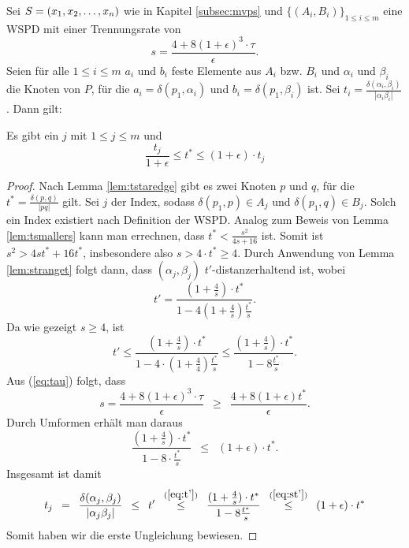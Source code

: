 Sei $S = (x_1, x_2, \mathellipsis, x_n)$ wie in Kapitel \ref{subsec:mvps} und $\{(A_i, B_i)\}_{1 \leq i \leq m}$ eine WSPD mit einer Trennungsrate von 
\[
s = \frac{4 + 8(1 + \epsilon)^3 \cdot \tau}{\epsilon}.
\]
Seien für alle $1 \leq i \leq m$ $a_i$ und $b_i$ feste Elemente aus $A_i$ bzw. $B_i$ und $\alpha_i$ und $\beta_i$ die Knoten von $P$, für die $a_i = \delta(p_1, \alpha_i)$ und $b_i = \delta(p_1, \beta_i)$ ist. 
Sei $t_i = \frac{\delta(\alpha_i, \beta_i)}{|\alpha_i \beta_i|}$. Dann gilt:
\begin{lemma}
	\label{lem:tstartj}
	Es gibt ein $j$ mit $1 \leq j \leq m$ und
	\[
		\frac{t_j}{1 + \epsilon} \leq t^* \leq (1 + \epsilon) \cdot t_j
	\]
\end{lemma}
\begin{proof}
	Nach Lemma \ref{lem:tstaredge} gibt es zwei Knoten $p$ und $q$, für die $t^* = \frac{\delta(p, q)}{|pq|}$ gilt. Sei $j$ der Index, sodass $\delta(p_1, p) \in A_j$ und $\delta(p_1, q) \in B_j$. Solch ein Index existiert nach Definition der WSPD. Analog zum Beweis von Lemma \ref{lem:tsmallers} kann man errechnen, dass $t^* < \frac{s^2}{4s + 16}$ ist. Somit ist $s^2 > 4st^* + 16t^*$, insbesondere also $s > 4\cdot t^* \geq 4$. 
	Durch Anwendung von Lemma \ref{lem:stranget} folgt dann, dass $(\alpha_j, \beta_j)$ $t'$-distanzerhaltend ist, wobei
	\[
	t' = \frac{(1 + \frac{4}{s}) \cdot t^*}{1 - 4(1 + \frac{4}{s})\frac{t^*}{s}}.
	\]
	Da wie gezeigt $s \geq 4$, ist
	\[
	\label{eq:t'}
	t' \leq  \frac{(1 + \frac{4}{s}) \cdot t^*}{1 - 4 \cdot (1 + \frac{4}{4}) \frac{t^*}{s}}
	\leq \frac{(1 + \frac{4}{s}) \cdot t^*}{1 - 8\frac{t^*}{s}}. \tag{1}
	\]
	Aus (\ref{eq:tau}) folgt, dass 
	\[
	s = \frac{4 + 8(1 + \epsilon)^3 \cdot \tau}{\epsilon} 
	\enspace\geq\enspace \frac{4 + 8(1 + \epsilon)t^*}{\epsilon}.
	\]
	Durch Umformen erhält man daraus
	\[
	\label{eq:st'}
	\frac{(1 + \frac{4}{s})\cdot t^*}{1 - 8 \cdot \frac{t^*}{s}} 
	\enspace\leq\enspace (1 + \epsilon)\cdot t^*. \tag{2}
	\]
	Insgesamt ist damit
	\[
	t_j 
	\enspace = \enspace \frac{\delta(\alpha_j, \beta_j)}{|\alpha_j \beta_j|} 
	\enspace\leq\enspace t' 
	\enspace\stackrel{(\ref{eq:t'})}{\leq}\enspace \frac{(1 + \frac{4}{s}) \cdot t^*}{1 - 8\frac{t^*}{s}}
	\enspace\stackrel{(\ref{eq:st'})}{\leq}\enspace (1 + \epsilon)\cdot t^*
	\]
	Somit haben wir die erste Ungleichung bewiesen.
	

\end{proof}
